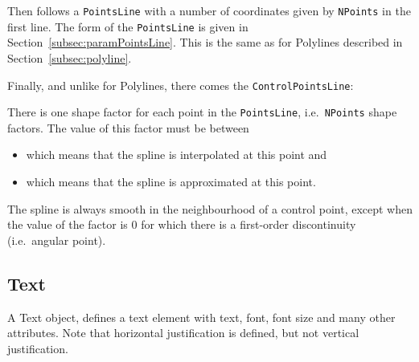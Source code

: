 \documentclass[10pt, a4paper, english]{article}%
\begin{document}
Then follows a \texttt{PointsLine} with a number of coordinates 
given by \texttt{NPoints} in the first line. 
The form of the \texttt{PointsLine} is given 
in Section~\ref{subsec:paramPointsLine}. 
This is the same as for Polylines described in Section~\ref{subsec:polyline}. 

Finally, and unlike for Polylines, there comes the \texttt{ControlPointsLine}: 

There is one shape factor for each point in the \texttt{PointsLine}, 
i.e.~\texttt{NPoints} shape factors. 
The value of this factor must be between 
%
\begin{itemize}
\item[-1] which means that the spline is interpolated at this point  and 
\item[+1] which means that the spline is approximated at this point. 
\end{itemize}
%
The spline is always smooth in the neighbourhood of a control point, 
except when the value of the factor is 0 
for which there is a first-order discontinuity (i.e.~angular point).


\subsection{Text}\label{subsec:text}

A Text object, defines a text element 
with text, font, font size and many other attributes. 
Note that horizontal justification is defined, 
but not vertical justification. 
\end{document}
